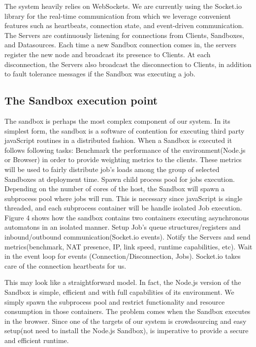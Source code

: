 \documentclass[10pt,reprint]{socc14}
\begin{document}
The system heavily relies on WebSockets. We are currently using the Socket.io \cite{Socket.} library for the real-time communication from which we leverage convenient features such as heartbeats, connection state, and event-driven communication. The Servers are continuously listening for connections from Clients, Sandboxes, and Datasources. Each time a new Sandbox connection comes in, the servers register the new node and broadcast its presence to Clients. At each disconnection, the Servers also broadcast the disconnection to Clients, in addition to fault tolerance messages if the Sandbox was executing a job.

\subsection{The Sandbox execution point}

The sandbox is perhaps the most complex component of our system. In its simplest form, the sandbox is a software of contention for executing third party javaScript routines in a distributed fashion. When a Sandbox is executed it follows following tasks:
Benchmark the performance of the environment(Node.js or Browser) in order to provide weighting metrics to the clients. These metrics will be used to fairly distribute job's loads among the group of selected Sandboxes at deployment time.
Spawn child process pool for jobs execution. Depending on the number of cores of the host, the Sandbox will spawn a subprocess pool where jobs will run. This is necessary since javaScript is single threaded, and each subprocess container will be handle isolated Job execution. Figure 4 shows how the sandbox contains two containers executing asynchronous automatons in an isolated manner.
Setup Job's queue structures/registers and inbound/outbound communication(Socket.io events).
Notify the Servers and send metrics(benchmark, NAT presence, IP, link speed, runtime capabilities, etc).
Wait in the event loop for events (Connection/Disconnection, Jobs). Socket.io takes care of the connection heartbeats for us.

This may look like a straightforward model. In fact, the Node.js version of the Sandbox is simple, efficient and with full capabilities of its environment. We simply spawn the subprocess pool and restrict functionality and resource consumption in those containers. The problem comes when the Sandbox executes in the browser. Since one of the targets of our system is crowdsourcing and easy setup(not need to install the Node.js Sandbox), is imperative to provide a secure and efficient runtime.
\end{document}
